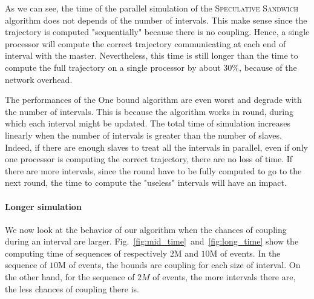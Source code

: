 \documentclass[a4paper,10pt]{article}
\begin{document}
As we can see, the time of the parallel simulation of the \textsc{Speculative Sandwich} algorithm does not depends of the number of intervals. This make sense since the trajectory is computed "sequentially" because there is no coupling. Hence, a single processor will compute the correct trajectory communicating at each end of interval with the master. Nevertheless, this time is still longer than the time to compute the full trajectory on a single processor by about $30\%$, because of the network overhead. 

The performances of the One bound algorithm are even worst and degrade with the number of intervals.
This is because the algorithm works in round, during which each interval might be updated. The total time of simulation increases linearly when the number of intervals is greater than the number of slaves. Indeed, if there are enough slaves to treat all the intervals in parallel, even if only one processor is computing the correct trajectory, there are no loss of time. If there are more intervals, since the round have to be fully computed to go to the next round, the time to compute the "useless" intervals will have an impact.

\paragraph{Longer simulation}

We now look at the behavior of our algorithm when the chances of coupling during an interval are larger. Fig.~\ref{fig:mid_time}~and~\ref{fig:long_time} show the computing time of sequences of respectively $2$M and $10$M of events. In the sequence of $10$M of events, the bounds are coupling for each size of interval. On the other hand, for the sequence of $2M$ of events, the more intervals there are, the less chances of coupling there is.
\end{document}
